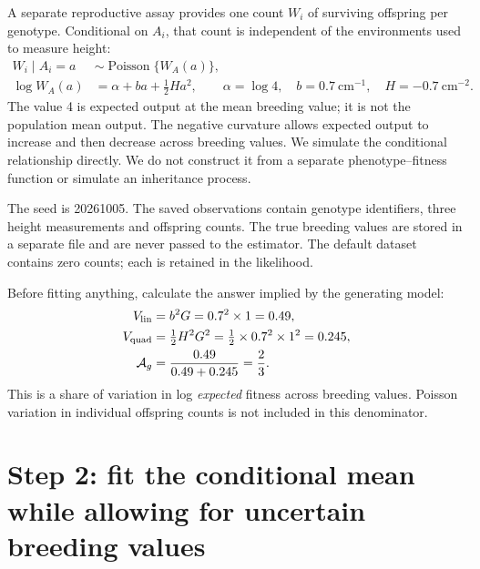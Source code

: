 \documentclass[11pt]{article}
\newcommand{\Ag}{\mathcal A_g}
\begin{document}
A separate reproductive assay provides one count $W_i$ of surviving offspring per genotype. Conditional on $A_i$, that count is independent of the environments used to measure height:
\begin{align}
 W_i\mid A_i=a&\sim\operatorname{Poisson}\{W_A(a)\},\label{eq:count}\\
 \log W_A(a)&=\alpha+ba+\tfrac12Ha^2,\qquad
 \alpha=\log4,\quad b=0.7\ \mathrm{cm}^{-1},\quad H=-0.7\ \mathrm{cm}^{-2}.\label{eq:surface}
\end{align}
The value 4 is expected output at the mean breeding value; it is not the population mean output. The negative curvature allows expected output to increase and then decrease across breeding values. We simulate the conditional relationship directly. We do not construct it from a separate phenotype--fitness function or simulate an inheritance process.

The seed is 20261005. The saved observations contain genotype identifiers, three height measurements and offspring counts. The true breeding values are stored in a separate file and are never passed to the estimator. The default dataset contains \ZeroCount{} zero counts; each is retained in the likelihood.

Before fitting anything, calculate the answer implied by the generating model:
\begin{align}
 V_{\rm lin}&=b^2G=0.7^2\times1=0.49,\label{eq:linear}\\
 V_{\rm quad}&=\tfrac12H^2G^2=\tfrac12\times0.7^2\times1^2=0.245,\label{eq:quadratic}\\
 \Ag&=\frac{0.49}{0.49+0.245}=\frac23.\label{eq:share}
\end{align}
This is a share of variation in log \emph{expected} fitness across breeding values. Poisson variation in individual offspring counts is not included in this denominator.

\section{Step 2: fit the conditional mean while allowing for uncertain breeding values}
\end{document}
